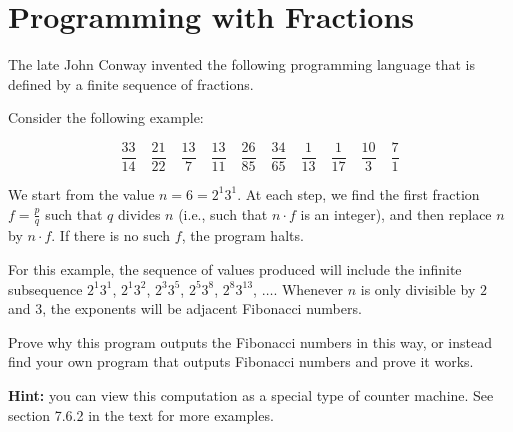 
\newtheorem{theorem}{Theorem}

\maketitle
\thispagestyle{firststyle}
\vspace{-2.0cm}


\section{Programming with Fractions}
    The late John Conway invented the following programming language that is defined by a finite sequence of fractions.
    
    Consider the following example:
    
    \[
    \frac{33}{14} \quad
    \frac{21}{22} \quad
    \frac{13}{7} \quad
    \frac{13}{11} \quad
    \frac{26}{85} \quad
    \frac{34}{65} \quad
    \frac{1}{13} \quad
    \frac{1}{17} \quad
    \frac{10}{3} \quad
    \frac{7}{1}
    \]
    
    We start from the value $n=6=2^1 3^1$. At each step, we find the first fraction $f=\frac{p}{q}$ such that $q$ divides $n$ (i.e., such that $n \cdot f$ is an integer), and then replace $n$ by $n \cdot f$. If there is no such $f$, the program halts.
    
    For this example, the sequence of values produced will include the infinite subsequence $2^1 3^1$, $2^1 3^2$, $2^3 3^5$, $2^5 3^8$, $2^8 3^{13}$, $\ldots$.
    Whenever $n$ is only divisible by $2$ and $3$, the exponents will be adjacent Fibonacci numbers.
    
    Prove why this program outputs the Fibonacci numbers in this way, or instead find your own program that outputs Fibonacci numbers and prove it works.
    
    \textbf{Hint:} you can view this computation as a special type of counter machine.
    See section 7.6.2 in the text for more examples.


